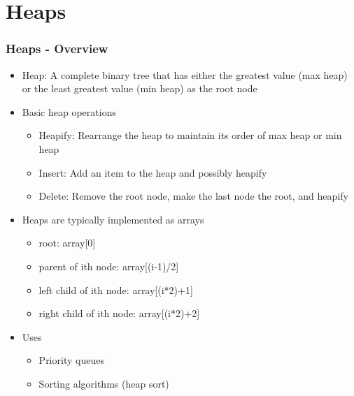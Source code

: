 \section{Heaps}
\begin{frame}\frametitle{Heaps - Overview}
\begin{itemize}
\item Heap: A complete binary tree that has either the greatest value (max heap) or the least greatest value (min heap) as the root node
\item Basic heap operations
	\begin{itemize}
	\item Heapify: Rearrange the heap to maintain its order of max heap or min heap
	\item Insert: Add an item to the heap and possibly heapify
	\item Delete: Remove the root node, make the last node the root, and heapify
	\end{itemize}
\item Heaps are typically implemented as arrays
	\begin{itemize}
	\item root: array[0]
	\item parent of ith node: array[(i-1)/2]
	\item left child of ith node: array[(i*2)+1]
	\item right child of ith node: array[(i*2)+2]
	\end{itemize}
\item Uses
	\begin{itemize}
	\item Priority queues
	\item Sorting algorithms (heap sort)
	\end{itemize}
\end{itemize}
\end{frame}

%
%
%

